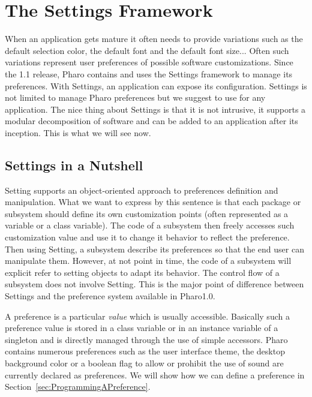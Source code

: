 \documentclass[a4paper,10pt,twoside]{book}
\begin{document}
\fi
\sloppy
\newcommand{\apl}[1]{\nnbb{Alain}{#1}} %
\newcommand{\setbrowser}{\textit{Settings Browser}}

\chapter{The Settings Framework}

When an application gets mature it often needs to provide variations such as the default selection color, the default font and the default font size... Often such variations represent user preferences of possible software customizations. 
Since the 1.1 release, Pharo contains and uses the Settings framework to manage its preferences. With Settings, an application can expose its configuration. Settings is not limited to manage Pharo preferences but we suggest to use for any application. The nice thing about Settings is that it is not intrusive, it supports a modular decomposition of software and can be added to an application after its inception. This is what we will see now.

\section{Settings in a Nutshell}

Setting supports an object-oriented approach to preferences definition and manipulation. What we want to express by this sentence is that each package or subsystem should define its own customization points (often represented as a variable or a class variable). The code of a subsystem then freely accesses such customization value and use it to change it behavior to reflect the preference. Then using Setting, a subsystem describe its preferences so that the end user can manipulate them. However, at not point in time, the code of a subsystem will explicit refer to setting objects to adapt its behavior. The control flow of a subsystem does not involve Setting. This is the major point of difference between Settings and the preference system available in Pharo1.0.

A preference is a particular \emph{value} which is usually accessible. Basically such a preference value is stored in a class variable or in an instance variable of a singleton and is directly managed through the use of simple accessors. Pharo contains numerous preferences such as the user interface theme, the desktop background color or a boolean flag to allow or prohibit the use of sound are currently declared as preferences. We will show how we can define a preference in Section~\ref{sec:ProgrammingAPreference}. 
\end{document}
